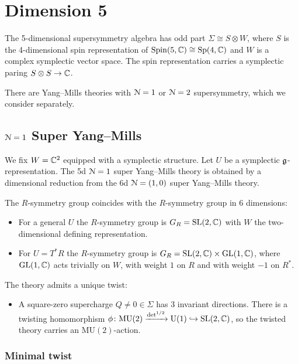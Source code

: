 \documentclass[10pt, oneside]{article}
\newcommand{\MU}{\mathrm{MU}}
\renewcommand{\U}{\mathrm{U}}
\begin{document}
\section{Dimension 5}

The 5-dimensional supersymmetry algebra has odd part $\Sigma\cong S\otimes W$, where $S$ is the 4-dimensional spin representation of $\mathrm{Spin}(5, \mathbb C)\cong \mathrm{Sp}(4, \mathbb C)$ and $W$ is a complex symplectic vector space. The spin representation carries a symplectic paring $S\otimes S\rightarrow \mathbb C$.

There are Yang--Mills theories with $\mathcal N=1$ or $\mathcal N=2$ supersymmetry, which we consider separately.

\subsection{\texorpdfstring{$\mathcal{N} = 1$}{N=1} Super Yang--Mills}
\label{5d_1_section}

We fix $W = \mathbb C^2$ equipped with a symplectic structure. Let $U$ be a symplectic $\mathfrak g$-representation. The 5d $\mathcal N=1$ super Yang--Mills theory is obtained by a dimensional reduction from the 6d $\mathcal N=(1, 0)$ super Yang--Mills theory.

The $R$-symmetry group coincides with the $R$-symmetry group in 6 dimensions:
\begin{itemize}
\item For a general $U$ the $R$-symmetry group is $G_R=\mathrm{SL}(2, \mathbb C)$ with $W$ the two-dimensional defining representation.

\item For $U=T^* R$ the $R$-symmetry group is $G_R=\mathrm{SL}(2, \mathbb C)\times \mathrm{GL}(1, \mathbb C)$, where $\mathrm{GL}(1, \mathbb C)$ acts trivially on $W$, with weight $1$ on $R$ and with weight $-1$ on $R^*$.
\end{itemize}

The theory admits a unique twist:
\begin{itemize}
\item A square-zero supercharge $Q\neq 0\in\Sigma$ has 3 invariant directions. There is a twisting homomorphism $\phi\colon \MU(2)\xrightarrow{\det^{1/2}}\U(1)\hookrightarrow \SL(2, \CC)$, so the twisted theory carries an $\MU(2)$-action.
\end{itemize}

\subsubsection{Minimal twist}
\label{sect:5d1minimaltwist}
\end{document}
